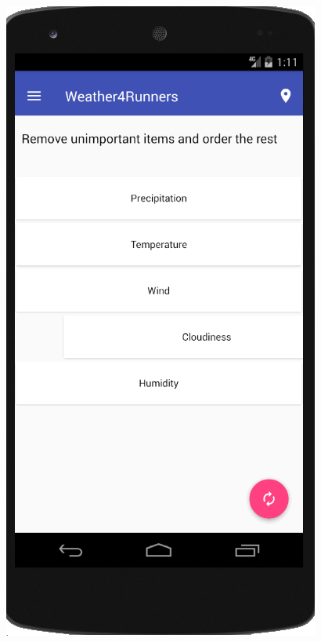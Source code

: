 \documentclass[11pt, a4paper, oneside]{scrartcl}
\begin{document}
\includegraphics[scale=0.7]{screen_imp_cond.png}
\end{document}
